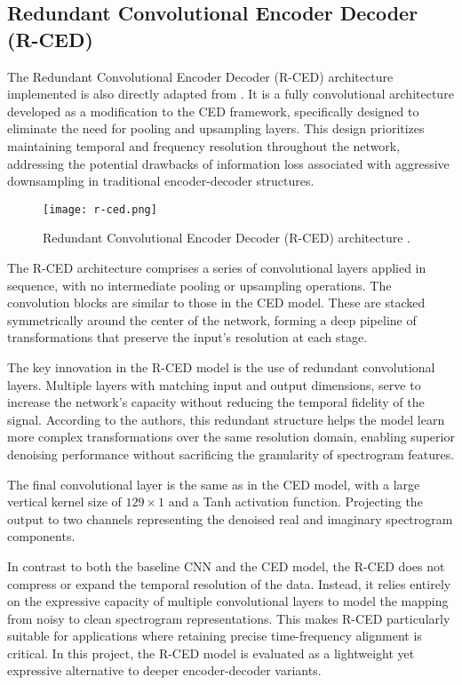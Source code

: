 \subsection{Redundant Convolutional Encoder Decoder (R-CED)}
\label{sec:rced}

The Redundant Convolutional Encoder Decoder (R-CED) architecture implemented is also directly adapted from \cite{park2017acoustic}. It is a fully convolutional architecture developed as a modification to the CED framework, specifically designed to eliminate the need for pooling and upsampling layers. This design prioritizes maintaining temporal and frequency resolution throughout the network, addressing the potential drawbacks of information loss associated with aggressive downsampling in traditional encoder-decoder structures.

\begin{figure}[h]
    \centering
    \texttt{[image: r-ced.png]}
    \caption{\label{fig:rced}Redundant Convolutional Encoder Decoder (R-CED) architecture \cite{park2017acoustic}.}
\end{figure}

The R-CED architecture comprises a series of convolutional layers applied in sequence, with no intermediate pooling or upsampling operations. The convolution blocks are similar to those in the CED model. These are stacked symmetrically around the center of the network, forming a deep pipeline of transformations that preserve the input’s resolution at each stage.

The key innovation in the R-CED model is the use of redundant convolutional layers. Multiple layers with matching input and output dimensions, serve to increase the network’s capacity without reducing the temporal fidelity of the signal. According to the authors, this redundant structure helps the model learn more complex transformations over the same resolution domain, enabling superior denoising performance without sacrificing the granularity of spectrogram features.

The final convolutional layer is the same as in the CED model, with a large vertical kernel size of \(129 \times 1\) and a Tanh activation function. Projecting the output to two channels representing the denoised real and imaginary spectrogram components.

In contrast to both the baseline CNN and the CED model, the R-CED does not compress or expand the temporal resolution of the data. Instead, it relies entirely on the expressive capacity of multiple convolutional layers to model the mapping from noisy to clean spectrogram representations. This makes R-CED particularly suitable for applications where retaining precise time-frequency alignment is critical. In this project, the R-CED model is evaluated as a lightweight yet expressive alternative to deeper encoder-decoder variants.

